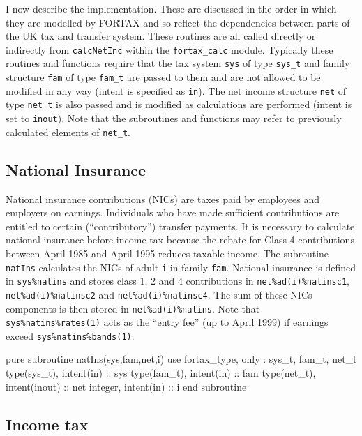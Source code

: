 \documentclass[11pt,thmsa,letter,ukenglish]{article}
\begin{document}
I now describe the implementation. These are discussed in the order in which they are modelled by FORTAX and so reflect the dependencies between parts of the UK tax and transfer system. These routines are all called directly or indirectly from \texttt{calcNetInc} within the \texttt{fortax\_calc} module. Typically these routines and functions require that the tax system \texttt{sys} of type \texttt{sys\_t} and family structure \texttt{fam} of type \texttt{fam\_t} are passed to them and are not allowed to be modified in any way (intent is specified as \texttt{in}). The net income structure \texttt{net} of type \texttt{net\_t} is also passed and is modified as calculations are performed (intent is set to \texttt{inout}). Note that the subroutines and functions may refer to previously calculated elements of \texttt{net\_t}.

\subsection{National Insurance}

National insurance contributions (NICs) are taxes paid by employees and employers on earnings. Individuals who have made sufficient contributions are entitled to certain (``contributory'') transfer payments. It is necessary to calculate national insurance before income tax because the rebate for Class 4 contributions between April 1985 and April 1995 reduces taxable income. The subroutine \texttt{natIns} calculates the NICs of adult \texttt{i} in family \texttt{fam}. National insurance is defined in \texttt{sys\%natins} and stores class 1, 2 and 4 contributions in \texttt{net\%ad(i)\%natinsc1}, \texttt{net\%ad(i)\%natinsc2} and \texttt{net\%ad(i)\%natinsc4}. The sum of these NICs components is then stored in \texttt{net\%ad(i)\%natins}. Note that \texttt{sys\%natins\%rates(1)} acts as the ``entry fee'' (up to April 1999) if earnings exceed \texttt{sys\%natins\%bands(1)}.

\begin{fortrancode}
pure subroutine natIns(sys,fam,net,i)
    use fortax_type, only : sys_t, fam_t, net_t
    type(sys_t), intent(in)    :: sys
    type(fam_t), intent(in)    :: fam
    type(net_t), intent(inout) :: net
    integer,     intent(in)    :: i
end subroutine
\end{fortrancode}

\subsection{Income tax}
\end{document}

